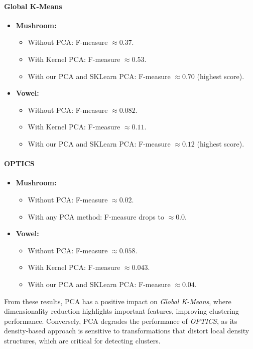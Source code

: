 \paragraph{Global K-Means}
\begin{itemize}
    \item \textbf{Mushroom:} 
    \begin{itemize}
        \item Without PCA: F-measure $\approx 0.37$.
        \item With Kernel PCA: F-measure $\approx 0.53$.
        \item With our PCA and SKLearn PCA: F-measure $\approx 0.70$ (highest score).
    \end{itemize}
    \item \textbf{Vowel:} 
    \begin{itemize}
        \item Without PCA: F-measure $\approx 0.082$.
        \item With Kernel PCA: F-measure $\approx 0.11$.
        \item With our PCA and SKLearn PCA: F-measure $\approx 0.12$ (highest score).
    \end{itemize}
\end{itemize}

\paragraph{OPTICS}
\begin{itemize}
    \item \textbf{Mushroom:} 
    \begin{itemize}
        \item Without PCA: F-measure $\approx 0.02$.
        \item With any PCA method: F-measure drops to $\approx 0.0$.
    \end{itemize}
    \item \textbf{Vowel:} 
    \begin{itemize}
        \item Without PCA: F-measure $\approx 0.058$.
        \item With Kernel PCA: F-measure $\approx 0.043$.
        \item With our PCA and SKLearn PCA: F-measure $\approx 0.04$.
    \end{itemize}
\end{itemize}


From these results, PCA has a positive impact on \textit{Global K-Means}, where dimensionality reduction
highlights important features, improving clustering performance. Conversely, PCA degrades
the performance of \textit{OPTICS}, as its density-based approach is sensitive to
transformations that distort local density structures, which are critical for detecting clusters\cite{sepin2023comparisonclusteringalgorithmsstatistical}.

